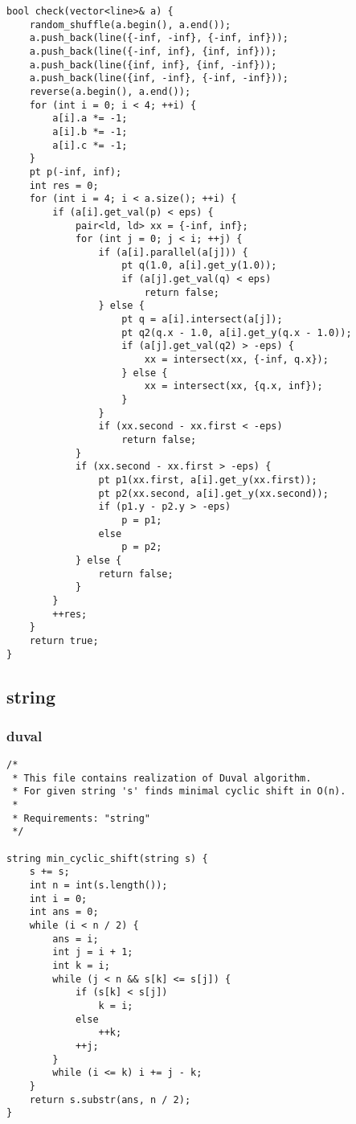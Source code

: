\begin{lstlisting}
bool check(vector<line>& a) {
    random_shuffle(a.begin(), a.end());
    a.push_back(line({-inf, -inf}, {-inf, inf}));
    a.push_back(line({-inf, inf}, {inf, inf}));
    a.push_back(line({inf, inf}, {inf, -inf}));
    a.push_back(line({inf, -inf}, {-inf, -inf}));
    reverse(a.begin(), a.end());
    for (int i = 0; i < 4; ++i) {
        a[i].a *= -1;
        a[i].b *= -1;
        a[i].c *= -1;
    }
    pt p(-inf, inf);
    int res = 0;
    for (int i = 4; i < a.size(); ++i) {
        if (a[i].get_val(p) < eps) {
            pair<ld, ld> xx = {-inf, inf};
            for (int j = 0; j < i; ++j) {
                if (a[i].parallel(a[j])) {
                    pt q(1.0, a[i].get_y(1.0));
                    if (a[j].get_val(q) < eps)
                        return false;
                } else {
                    pt q = a[i].intersect(a[j]);
                    pt q2(q.x - 1.0, a[i].get_y(q.x - 1.0));
                    if (a[j].get_val(q2) > -eps) {
                        xx = intersect(xx, {-inf, q.x});
                    } else {
                        xx = intersect(xx, {q.x, inf});
                    }
                }
                if (xx.second - xx.first < -eps)
                    return false;
            }
            if (xx.second - xx.first > -eps) {
                pt p1(xx.first, a[i].get_y(xx.first));
                pt p2(xx.second, a[i].get_y(xx.second));
                if (p1.y - p2.y > -eps)
                    p = p1;
                else
                    p = p2;
            } else {
                return false;
            }
        }
        ++res;
    }
    return true;
}
\end{lstlisting}
\subsection{string}
\subsubsection{duval}
\begin{lstlisting}
/*
 * This file contains realization of Duval algorithm.
 * For given string 's' finds minimal cyclic shift in O(n).
 *
 * Requirements: "string"
 */

string min_cyclic_shift(string s) {
    s += s;
    int n = int(s.length());
    int i = 0;
    int ans = 0;
    while (i < n / 2) {
        ans = i;
        int j = i + 1;
        int k = i;
        while (j < n && s[k] <= s[j]) {
            if (s[k] < s[j])
                k = i;
            else
                ++k;
            ++j;
        }
        while (i <= k) i += j - k;
    }
    return s.substr(ans, n / 2);
}
\end{lstlisting}
